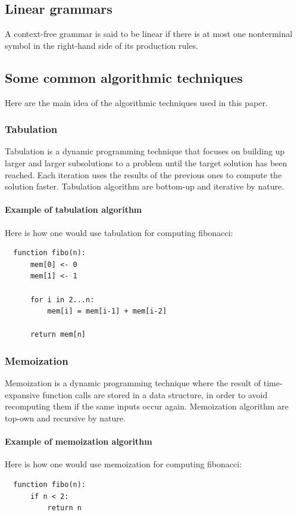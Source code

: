 \documentclass[]{article}
\begin{document}
\begin{multicols}{2}
\subsection{Linear grammars}
A context-free grammar is said to be linear if there is at most one nonterminal
symbol in the right-hand side of its production rules.

\subsection{Some common algorithmic techniques}
Here are the main idea of the algorithmic techniques used in this paper.

\subsubsection{Tabulation}
Tabulation is a dynamic programming technique that focuses on building up larger and larger subsolutions to a problem until the target solution has been reached. Each iteration uses the results of the previous ones to compute the solution faster. Tabulation algorithm are bottom-up and iterative by nature.

\paragraph{Example of tabulation algorithm} Here is how one would use tabulation for computing fibonacci:\\
\begin{lstlisting}
  function fibo(n):
      mem[0] <- 0
      mem[1] <- 1

      for i in 2...n:
          mem[i] = mem[i-1] + mem[i-2]
      
      return mem[n]
\end{lstlisting}

\subsubsection{Memoization}
Memoization is a dynamic programming technique where the result of time-expansive function calls are stored in a data structure, in order to avoid recomputing them if the same inputs occur again. Memoization algorithm are top-own and recursive by nature.

\paragraph{Example of memoization algorithm} Here is how one would use memoization for computing fibonacci:\\
\begin{lstlisting}
  function fibo(n):
      if n < 2:
          return n


\end{lstlisting}
\end{multicols}
\end{document}
